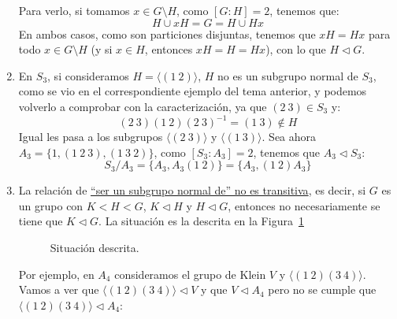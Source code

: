 \begin{ejemplo}
\begin{enumerate}
            Para verlo, si tomamos $x\in G\setminus H$, como $[G:H] = 2$, tenemos que:
                \begin{equation*}
                    H\cup xH = G = H\cup Hx
                \end{equation*}
                En ambos casos, como son particiones disjuntas, tenemos que $xH = Hx$ para todo $x\in G\setminus H$ (y si $x\in H$, entonces $xH = H = Hx$), con lo que $H\lhd G$.
        \item En $S_3$, si consideramos $H = \langle (1\ 2) \rangle $, $H$ no es un subgrupo normal de $S_3$, como se vio en el correspondiente ejemplo del tema anterior, y podemos volverlo a comprobar con la caracterización, ya que $(2\ 3)\in S_3$ y:
            \begin{equation*}
                (2\ 3)(1\ 2){(2\ 3)}^{-1} = (1\ 3)\notin H
            \end{equation*}
            Igual les pasa a los subgrupos $\langle (2\ 3) \rangle $ y $\langle (1\ 3) \rangle $. Sea ahora $A_3 = \{1, (1\ 2\ 3), (1\ 3\ 2)\}$, como $[S_3:A_3]=2$, tenemos que $A_3\lhd S_3$:
            \begin{equation*}
                S_3 / A_3 = \{A_3, A_3(1\ 2)\} = \{A_3, (1\ 2)A_3\}
            \end{equation*}
        \item La relación de \underline{``ser un subgrupo normal de'' no es transitiva}, es decir, si $G$ es un grupo con $K<H<G$, $K\lhd H$ y $H\lhd G$, entonces no necesariamente se tiene que $K\lhd G$. La situación es la descrita en la Figura~\ref{fig:situacion}
            \begin{figure}[H]
                \centering
                \caption{Situación descrita.}
                \label{fig:situacion}
            \end{figure}

            Por ejemplo, en $A_4$ consideramos el grupo de Klein $V$ y $\langle (1\ 2)(3\ 4) \rangle $. Vamos a ver que $\langle (1\ 2)(3\ 4) \rangle \lhd V$ y que $V \lhd A_4 $ pero no se cumple que $\langle (1\ 2)(3\ 4) \rangle \lhd A_4 $:
            \begin{figure}[H]
                \centering
\end{figure}
\end{enumerate}
\end{ejemplo}
